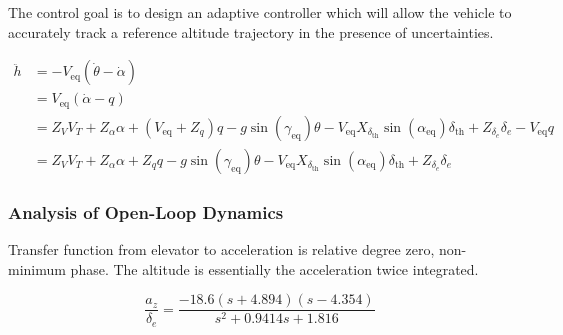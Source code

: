
The control goal is to design an adaptive controller which will allow the vehicle to accurately track a reference altitude trajectory in the presence of uncertainties.

\begin{equation*}
  \begin{split}
    \ddot{h}&=-V_{\text{eq}}(\dot{\theta}-\dot{\alpha}) \\
    &=V_{\text{eq}}(\dot{\alpha}-q) \\
    &=Z_{V}V_{T}+Z_{\alpha}\alpha+(V_{\text{eq}}+Z_{q})q-g\sin(\gamma_{\text{eq}})\theta-V_{\text{eq}}X_{\delta_{\text{th}}}\sin(\alpha_{\text{eq}})\delta_{\text{th}}+Z_{\delta_{e}}\delta_{e}-V_{\text{eq}}q \\
    &=Z_{V}V_{T}+Z_{\alpha}\alpha+Z_{q}q-g\sin(\gamma_{\text{eq}})\theta-V_{\text{eq}}X_{\delta_{\text{th}}}\sin(\alpha_{\text{eq}})\delta_{\text{th}}+Z_{\delta_{e}}\delta_{e}
  \end{split}
\end{equation*}

\subsubsection{Analysis of Open-Loop Dynamics}

Transfer function from elevator to acceleration is relative degree zero, non-minimum phase.
The altitude is essentially the acceleration twice integrated.

\begin{equation*}
  \frac{a_{z}}{\delta_{e}}=\frac{-18.6(s+4.894)(s-4.354)}{s^{2}+0.9414s+1.816}
\end{equation*}


